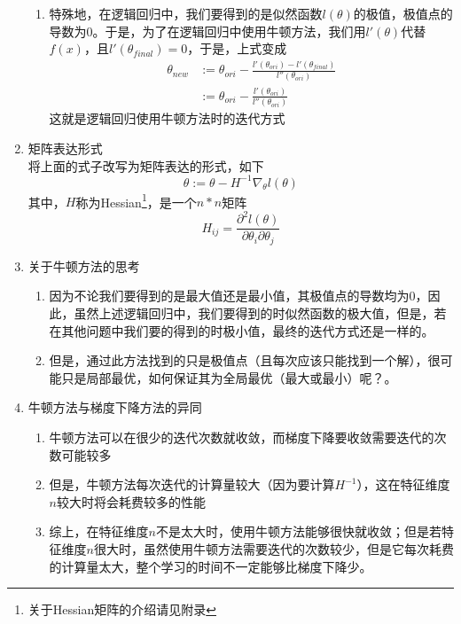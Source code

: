 \begin{enumerate}
\begin{enumerate}
		\item 特殊地，在逻辑回归中，我们要得到的是似然函数$l(\theta)$的极值，极值点的导数为$0$。于是，为了在逻辑回归中使用牛顿方法，我们用$l'(\theta)$代替$f(x)$，且$l'(\theta_{final}) = 0$，于是，上式变成
		\begin{align}
			\theta_{new} &:= \theta_{ori} - \frac{l'(\theta_{ori})-l'(\theta_{final})}{l''(\theta_{ori})} \\
			&:=  \theta_{ori} - \frac{l'(\theta_{ori})}{l''(\theta_{ori})}
		\end{align}
		这就是逻辑回归使用牛顿方法时的迭代方式
	\end{enumerate}

	\item 矩阵表达形式 \\
	将上面的式子改写为矩阵表达的形式，如下
	\begin{equation}
		\theta := \theta - H^{-1}\nabla_{\theta}l(\theta)
	\end{equation}
	其中，$H$称为Hessian\footnote{关于Hessian矩阵的介绍请见附录}，是一个$n*n$矩阵
	\begin{equation}
		H_{ij} = \frac{\partial^2l(\theta)}{\partial\theta_i\partial\theta_j}
	\end{equation}

	\item 关于牛顿方法的思考
	\begin{enumerate}
		\item 因为不论我们要得到的是最大值还是最小值，其极值点的导数均为$0$，因此，虽然上述逻辑回归中，我们要得到的时似然函数的极大值，但是，若在其他问题中我们要的得到的时极小值，最终的迭代方式还是一样的。
		\item 但是，通过此方法找到的只是极值点（且每次应该只能找到一个解），很可能只是局部最优，如何保证其为全局最优（最大或最小）呢？。{\color{red}{此项待研究。。}}
	\end{enumerate}

	\item 牛顿方法与梯度下降方法的异同
	\begin{enumerate}
		\item 牛顿方法可以在很少的迭代次数就收敛，而梯度下降要收敛需要迭代的次数可能较多
		\item 但是，牛顿方法每次迭代的计算量较大（因为要计算$H^{-1}$），这在特征维度$n$较大时将会耗费较多的性能
		\item 综上，在特征维度$n$不是太大时，使用牛顿方法能够很快就收敛；但是若特征维度$n$很大时，虽然使用牛顿方法需要迭代的次数较少，但是它每次耗费的计算量太大，整个学习的时间不一定能够比梯度下降少。
	\end{enumerate}
\end{enumerate}














